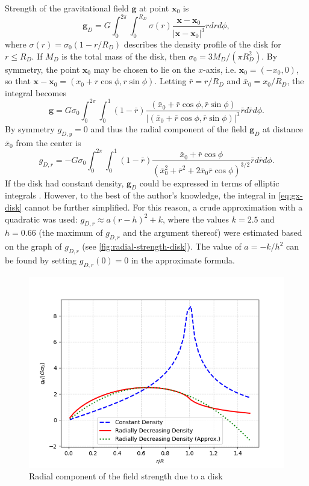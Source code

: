 Strength of the gravitational field $\mathbf{g}$ at point $\mathbf{x}_0$ is
\begin{equation*}
    \mathbf{g}_D = G \int_{0}^{2\pi}\int_{0}^{R_D} \sigma(r) \frac{\mathbf{x} - \mathbf{x}_0}{|\mathbf{x} - \mathbf{x}_0|^3}r dr d\phi,
\end{equation*}
where $\sigma(r) = \sigma_0(1 - r/R_D)$ describes the density profile of the disk for $r \leq R_D$.
If $M_D$ is the total mass of the disk, then $\sigma_0 = 3M_D / (\pi R_D^2)$.
By symmetry, the point $\mathbf{x}_0$ may be chosen to lie on the $x$-axis, i.e. $\mathbf{x}_0 = (-x_0, 0)$, so that $\mathbf{x} - \mathbf{x}_0 = (x_0 + r\cos\phi, r\sin\phi)$.
Letting $\bar{r} = r/R_D$ and $\bar{x}_0 = x_0 / R_D$, the integral becomes
\begin{equation*}
    \mathbf{g} = G\sigma_0 \int_{0}^{2\pi} \int_{0}^{1} (1 - \bar{r}) \frac{(\bar{x}_0 + \bar{r}\cos\phi, \bar{r}\sin\phi)}{|(\bar{x}_0 + \bar{r}\cos\phi, \bar{r}\sin\phi)|^3}\bar{r} d\bar{r} d\phi.
\end{equation*}
By symmetry $g_{D,y} = 0$ and thus the radial component of the field $\mathbf{g}_D$ at distance $\bar{x}_0$ from the center is
\begin{equation}\label{eq:gx-disk}
    g_{D,r} = -G\sigma_0 \int_{0}^{2\pi} \int_{0}^{1} (1 - \bar{r})\frac{\bar{x}_0 + \bar{r}\cos\phi}{(\bar{x}_0^2+\bar{r}^2+2\bar{x}_0\bar{r}\cos\phi)^{3/2}}\bar{r}d\bar{r}d\phi.
\end{equation}
If the disk had constant density, $\mathbf{g}_D$ could be expressed in terms of elliptic integrals \cite{Weiss2018}.
However, to the best of the author's knowledge, the integral in \autoref{eq:gx-disk} cannot be further simplified.
For this reason, a crude approximation with a quadratic was used: $g_{D,r} \approx a(r - h)^2 + k$, where the values $k=2.5$ and $h=0.66$ (the maximum of $g_{D,r}$ and the argument thereof) were estimated based on the graph of $g_{D,r}$ (see \autoref{fig:radial-strength-disk}).
The value of $a = -k/h^2$ can be found by setting $g_{D,r}(0) = 0$ in the approximate formula.
\begin{figure}[htp]
    \centering
    \includegraphics[scale=0.6]{img/disk-field.png}
    \caption{Radial component of the field strength due to a disk}
    \label{fig:radial-strength-disk}
\end{figure}

